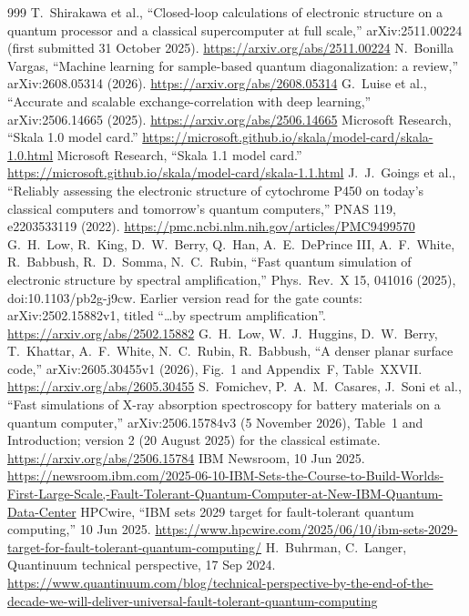\begin{thebibliography}{999}
 T.~Shirakawa et al., ``Closed-loop calculations of electronic structure on a quantum processor and a classical supercomputer at full scale,'' arXiv:2511.00224 (first submitted 31 October 2025). \url{https://arxiv.org/abs/2511.00224}
 N.~Bonilla Vargas, ``Machine learning for sample-based quantum diagonalization: a review,'' arXiv:2608.05314 (2026). \url{https://arxiv.org/abs/2608.05314}
 G.~Luise et al., ``Accurate and scalable exchange-correlation with deep learning,'' arXiv:2506.14665 (2025). \url{https://arxiv.org/abs/2506.14665}
 Microsoft Research, ``Skala 1.0 model card.'' \url{https://microsoft.github.io/skala/model-card/skala-1.0.html}
 Microsoft Research, ``Skala 1.1 model card.'' \url{https://microsoft.github.io/skala/model-card/skala-1.1.html}
 J.~J.~Goings et al., ``Reliably assessing the electronic structure of cytochrome P450 on today's classical computers and tomorrow's quantum computers,'' PNAS 119, e2203533119 (2022). \url{https://pmc.ncbi.nlm.nih.gov/articles/PMC9499570}
 G.~H.~Low, R.~King, D.~W.~Berry, Q.~Han, A.~E.~DePrince III, A.~F.~White, R.~Babbush, R.~D.~Somma, N.~C.~Rubin, ``Fast quantum simulation of electronic structure by spectral amplification,'' Phys.\ Rev.\ X 15, 041016 (2025), doi:10.1103/pb2g-j9cw. Earlier version read for the gate counts: arXiv:2502.15882v1, titled ``\ldots by spectrum amplification''. \url{https://arxiv.org/abs/2502.15882}
 G.~H.~Low, W.~J.~Huggins, D.~W.~Berry, T.~Khattar, A.~F.~White, N.~C.~Rubin, R.~Babbush, ``A denser planar surface code,'' arXiv:2605.30455v1 (2026), Fig.~1 and Appendix~F, Table~XXVII. \url{https://arxiv.org/abs/2605.30455}
 S.~Fomichev, P.~A.~M.~Casares, J.~Soni et al., ``Fast simulations of X-ray absorption spectroscopy for battery materials on a quantum computer,'' arXiv:2506.15784v3 (5 November 2026), Table~1 and Introduction; version 2 (20 August 2025) for the classical estimate. \url{https://arxiv.org/abs/2506.15784}
 IBM Newsroom, 10 Jun 2025. \url{https://newsroom.ibm.com/2025-06-10-IBM-Sets-the-Course-to-Build-Worlds-First-Large-Scale,-Fault-Tolerant-Quantum-Computer-at-New-IBM-Quantum-Data-Center}
 HPCwire, ``IBM sets 2029 target for fault-tolerant quantum computing,'' 10 Jun 2025. \url{https://www.hpcwire.com/2025/06/10/ibm-sets-2029-target-for-fault-tolerant-quantum-computing/}
 H.~Buhrman, C.~Langer, Quantinuum technical perspective, 17 Sep 2024. \url{https://www.quantinuum.com/blog/technical-perspective-by-the-end-of-the-decade-we-will-deliver-universal-fault-tolerant-quantum-computing}

\end{thebibliography}
